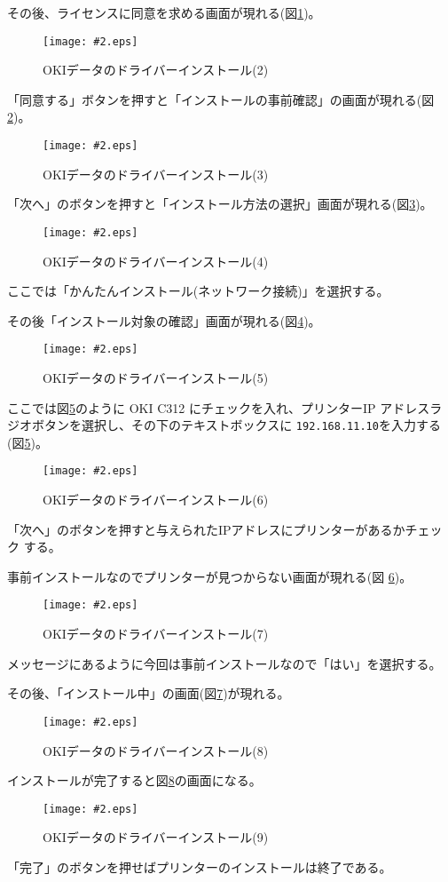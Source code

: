 \documentclass[a4j]{jarticle}
\newcommand{\Fig}[4]{%
\begin{figure}[h]
\centering  \texttt{[image: \#2.eps]}
 \caption{#3}\label{#4}
\end{figure}}
\newcommand{\FigL}[3]{\Fig{0.7}{#1}{#2}{#3}}
\newcommand{\FigS}[3]{\Fig{0.4}{#1}{#2}{#3}}
\begin{document}
その後、ライセンスに同意を求める画面が現れる(図\ref{Install02})。
\FigL{Install02}{OKIデータのドライバーインストール(2)}{Install02}

「同意する」ボタンを押すと「インストールの事前確認」の画面が現れる(図
\ref{Install03})。
\FigL{Install03}{OKIデータのドライバーインストール(3)}{Install03}
\newpage

「次へ」のボタンを押すと「インストール方法の選択」画面が現れる(図\ref{Install04})。

\FigL{Install04}{OKIデータのドライバーインストール(4)}{Install04}

ここでは「かんたんインストール(ネットワーク接続)」を選択する。

その後「インストール対象の確認」画面が現れる(図\ref{Install05})。
\FigL{Install05}{OKIデータのドライバーインストール(5)}{Install05}

ここでは図\ref{Install06}のように OKI C312 にチェックを入れ、プリンターIP
アドレスラジオボタンを選択し、その下のテキストボックスに
\texttt{192.168.11.10}を入力する(図\ref{Install06})。
\FigL{Install06}{OKIデータのドライバーインストール(6)}{Install06}

「次へ」のボタンを押すと与えられたIPアドレスにプリンターがあるかチェック
する。

事前インストールなのでプリンターが見つからない画面が現れる(図
\ref{Install065})。
\FigS{Install065}{OKIデータのドライバーインストール(7)}{Install065}

メッセージにあるように今回は事前インストールなので「はい」を選択する。

その後、「インストール中」の画面(図\ref{Install07})が現れる。
\FigL{Install07}{OKIデータのドライバーインストール(8)}{Install07}

インストールが完了すると図\ref{Install08}の画面になる。
\FigL{Install08}{OKIデータのドライバーインストール(9)}{Install08}

「完了」のボタンを押せばプリンターのインストールは終了である。
\end{document}
